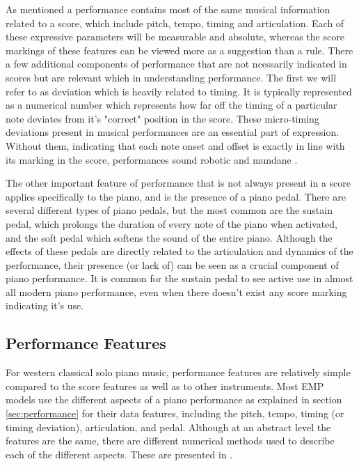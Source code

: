 As mentioned a performance contains most of the same musical information related to a score, which include pitch, tempo, timing and articulation. Each of these expressive parameters will be measurable and absolute, whereas the score markings of these features can be viewed more as a suggestion than a rule. There a few additional components of performance that are not ncessarily indicated in scores but are relevant which in understanding performance. The first we will refer to as deviation which is heavily related to timing. It is typically represented as a numerical number which represents how far off the timing of a particular note deviates from it's "correct" position in the score. These micro-timing deviations present in musical performances are an essential part of expression. Without them, indicating that each note onset and offset is exactly in line with its marking in the score, performances sound robotic and mundane . 

The other important feature of performance that is not always present in a score applies specifically to the piano, and is the presence of a piano pedal. There are several different types of piano pedals, but the most common are the sustain pedal, which prolongs the duration of every note of the piano when activated, and the soft pedal which softens the sound of the entire piano. Although the effects of these pedals are directly related to the articulation and dynamics of the performance, their presence (or lack of) can be seen as a crucial component of piano performance. It is common for the sustain pedal to see active use in almost all modern piano performance, even when there doesn't exist any score marking indicating it's use. 

\subsection{Performance Features}
For western classical solo piano music, performance features are relatively simple compared to the score features as well as to other instruments. Most EMP models use the different aspects of a piano performance as explained in section \ref{sec:performance} for their data features, including the pitch, tempo, timing (or timing deviation), articulation, and pedal. Although at an abstract level the features are the same, there are different numerical methods used to describe each of the different aspects. These are presented in . 

